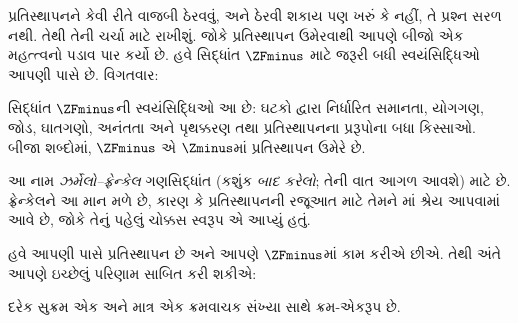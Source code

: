 \begingroup
\makeatletter{}\makeatother

\label{guunit:OLP-0555}


પ્રતિસ્થાપનને કેવી રીતે વાજબી ઠેરવવું, અને ઠેરવી શકાય પણ ખરું કે
નહીં, તે પ્રશ્ન સરળ નથી. તેથી તેની ચર્ચા
 માટે રાખીશું. જોકે પ્રતિસ્થાપન
ઉમેરવાથી આપણે બીજો એક મહત્ત્વનો પડાવ પાર કર્યો છે. હવે સિદ્ધાંત
$\ZFminus$ માટે જરૂરી બધી સ્વયંસિદ્ધિઓ આપણી પાસે છે. વિગતવાર:

\begin{defn}
સિદ્ધાંત $\ZFminus$ની સ્વયંસિદ્ધિઓ આ છે: ઘટકો દ્વારા નિર્ધારિત
સમાનતા, યોગગણ, જોડ, ઘાતગણો, અનંતતા અને પૃથક્કરણ તથા
પ્રતિસ્થાપનના પ્રરૂપોના બધા કિસ્સાઓ. બીજા શબ્દોમાં, $\ZFminus$
એ $\Zminus$માં પ્રતિસ્થાપન ઉમેરે છે.
\end{defn}
\noindent
આ નામ \emph{ઝર્મેલો--ફ્રેન્કેલ} ગણસિદ્ધાંત (કશુંક \emph{બાદ કરેલો};
તેની વાત આગળ આવશે) માટે છે. ફ્રેન્કેલને આ માન મળે છે, કારણ કે
પ્રતિસ્થાપનની રજૂઆત માટે તેમને \citeyear{Fraenkel1922}માં શ્રેય
આપવામાં આવે છે, જોકે તેનું પહેલું ચોક્કસ સ્વરૂપ
\citet{Skolem1922}એ આપ્યું હતું.
\endgroup

\begingroup
\makeatletter{}\makeatother

\label{guunit:OLP-0556}


હવે આપણી પાસે પ્રતિસ્થાપન છે અને આપણે $\ZFminus$માં કામ કરીએ છીએ.
તેથી અંતે આપણે ઇચ્છેલું પરિણામ સાબિત કરી શકીએ:

\begin{thm}
દરેક સુક્રમ એક અને માત્ર એક ક્રમવાચક સંખ્યા સાથે ક્રમ-એકરૂપ છે.
\end{thm}

